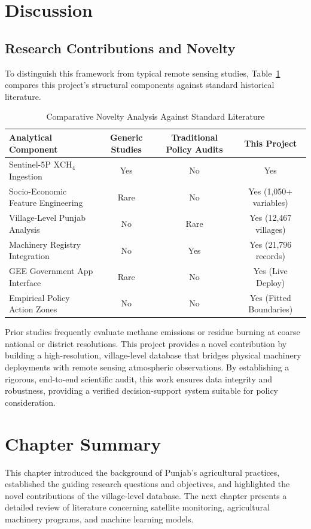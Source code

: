 \documentclass[12pt,a4paper]{report}
\begin{document}
\section{Discussion}
\subsection{Research Contributions and Novelty}
To distinguish this framework from typical remote sensing studies, Table~\ref{tab:novelty_comparison} compares this project's structural components against standard historical literature.

\begin{table}[H]
\centering
\caption{Comparative Novelty Analysis Against Standard Literature}
\label{tab:novelty_comparison}
\begin{tabular}{lccc}
\toprule
\textbf{Analytical Component} & \textbf{Generic Studies} & \textbf{Traditional Policy Audits} & \textbf{This Project} \\
\midrule
Sentinel-5P $\text{XCH}_4$ Ingestion & Yes & No & Yes \\
Socio-Economic Feature Engineering & Rare & No & Yes (1,050+ variables) \\
Village-Level Punjab Analysis & No & Rare & Yes (12,467 villages) \\
Machinery Registry Integration & No & Yes & Yes (21,796 records) \\
GEE Government App Interface & Rare & No & Yes (Live Deploy) \\
Empirical Policy Action Zones & No & No & Yes (Fitted Boundaries) \\
\bottomrule
\end{tabular}
\end{table}

Prior studies frequently evaluate methane emissions or residue burning at coarse national or district resolutions. This project provides a novel contribution by building a high-resolution, village-level database that bridges physical machinery deployments with remote sensing atmospheric observations. By establishing a rigorous, end-to-end scientific audit, this work ensures data integrity and robustness, providing a verified decision-support system suitable for policy consideration.

\section{Chapter Summary}
This chapter introduced the background of Punjab's agricultural practices, established the guiding research questions and objectives, and highlighted the novel contributions of the village-level database. The next chapter presents a detailed review of literature concerning satellite monitoring, agricultural machinery programs, and machine learning models.
\end{document}
